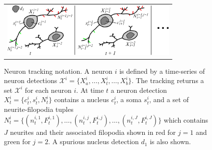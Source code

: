 \begin{figure}[t]
  \begin{center}
       \begin{tabular}{@{\hspace{-1mm}}c}
        \includegraphics[width = 87mm] {images/neurondrawing.pdf}\\ [-2.4ex]
       \end{tabular} 
    \caption{ \footnotesize   Neuron  tracking  notation.    A
        neuron $i$  is defined by  a time-series of  neuron detections
        $\mathcal{X}^i     =     \{X_{a}^i,\ldots,X_t^i,\ldots,X_{b}^i
        \}$.  The  tracking returns  a  set  $\mathcal{X}^i$ for  each
        neuron $i$.  At time $t$ a neuron detection $X_t^i = \{ c_t^i,
        s_t^i, N_t^i  \}$ contains a nucleus $c_t^i$,  a soma $s_t^i$,
        and    a  set of   neurite-filopodia    tuples    $N_t^i     =    \{(
        n_t^{i,1},F_t^{i,1}),   \ldots,(n_t^{i,j},F_t^{i,j}),  \ldots,
        (n_t^{i,J},F_t^{i,J})  \}$  which  contains $J$  neurites  and
        their associated  filopodia shown in  red for $j=1$  and green
        for  $j=2$. A spurious nucleus  detection  $d_1$ is also shown.}
    \label{fig:notation}
  \end{center}
\vspace{-8mm}
\end{figure}







\vspace{-3mm}
